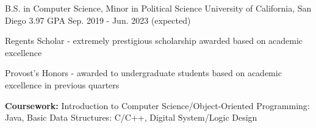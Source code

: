 

\begin{cventries}

    \cventry
    {B.S. in Computer Science, Minor in Political Science} %
    {University of California, San Diego} %
    {3.97 GPA} %
    {Sep. 2019 - Jun. 2023 (expected)} %
    {
      \begin{cvitems} %
        \item {Regents Scholar - extremely prestigious scholarship awarded based on academic excellence}
        \item {Provost's Honors - awarded to undergraduate students based on academic excellence in previous quarters}
        \item {\textbf{Coursework:} Introduction to Computer Science/Object-Oriented Programming: Java, Basic Data Structures: C/C++, Digital System/Logic Design}
      \end{cvitems}
    }

\end{cventries}
